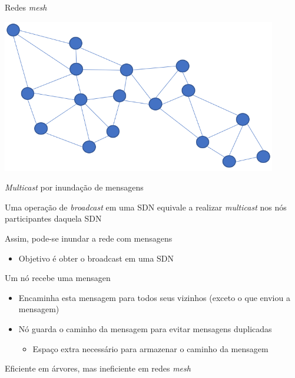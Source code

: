 \documentclass[compress]{beamer}
\begin{document}
\begin{frame}{Redes \textit{mesh}}


\centering\includegraphics[width=0.9\textwidth]{images/mesh.png}

\end{frame}


\begin{frame}{\textit{Multicast} por inundação de mensagens}

Uma operação de \textit{broadcast} em uma SDN equivale a realizar \textit{multicast} nos nós participantes daquela SDN

\vspace{0.3cm}

Assim, pode-se inundar a rede com mensagens
\begin{itemize}
    \item Objetivo é obter o broadcast em uma SDN
\end{itemize}

\vspace{0.3cm}

Um nó recebe uma mensagen
\begin{itemize}
    \item Encaminha esta mensagem para todos seus vizinhos (exceto o que enviou a mensagem)
    \item Nó guarda o caminho da mensagem para evitar mensagens duplicadas
    \begin{itemize}
        \item Espaço extra necessário para armazenar o caminho da mensagem
    \end{itemize}
\end{itemize}

\vspace{0.3cm}

Eficiente em árvores, mas ineficiente em redes \textit{mesh}
\end{frame}
\end{document}
